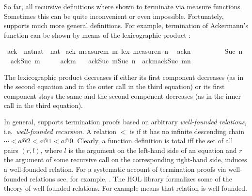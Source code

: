 %
\begin{isabellebody}%
\def\isabellecontext{WFrec}%
%
\begin{isamarkuptext}%
\noindent
So far, all recursive definitions where shown to terminate via measure
functions. Sometimes this can be quite inconvenient or even
impossible. Fortunately,  supports much more
general definitions. For example, termination of Ackermann's function
can be shown by means of the lexicographic product :%
\end{isamarkuptext}%
\ ack\ {\isacharcolon}{\isacharcolon}\ {\isachardoublequote}nat{\isasymtimes}nat\ {\isasymRightarrow}\ nat{\isachardoublequote}\isanewline
{}\ ack\ {\isachardoublequote}measure{\isacharparenleft}{\isasymlambda}m{\isachardot}\ m{\isacharparenright}\ {\isacharless}{\isacharasterisk}lex{\isacharasterisk}{\isachargreater}\ measure{\isacharparenleft}{\isasymlambda}n{\isachardot}\ n{\isacharparenright}{\isachardoublequote}\isanewline
\ \ {\isachardoublequote}ack{\isacharparenleft}{}{\isacharcomma}n{\isacharparenright}\ \ \ \ \ \ \ \ \ {\isacharequal}\ Suc\ n{\isachardoublequote}\isanewline
\ \ {\isachardoublequote}ack{\isacharparenleft}Suc\ m{\isacharcomma}{}{\isacharparenright}\ \ \ \ \ {\isacharequal}\ ack{\isacharparenleft}m{\isacharcomma}\ {}{\isacharparenright}{\isachardoublequote}\isanewline
\ \ {\isachardoublequote}ack{\isacharparenleft}Suc\ m{\isacharcomma}Suc\ n{\isacharparenright}\ {\isacharequal}\ ack{\isacharparenleft}m{\isacharcomma}ack{\isacharparenleft}Suc\ m{\isacharcomma}n{\isacharparenright}{\isacharparenright}{\isachardoublequote}%
\begin{isamarkuptext}%
\noindent
The lexicographic product decreases if either its first component
decreases (as in the second equation and in the outer call in the
third equation) or its first component stays the same and the second
component decreases (as in the inner call in the third equation).

In general,  supports termination proofs based on
arbitrary \emph{well-founded relations}, i.e.\ \emph{well-founded
recursion}.  A relation $<$ is
 if it has no infinite descending chain $\cdots <
a@2 < a@1 < a@0$. Clearly, a function definition is total iff the set
of all pairs $(r,l)$, where $l$ is the argument on the left-hand side
of an equation and $r$ the argument of some recursive call on the
corresponding right-hand side, induces a well-founded relation.  For a
systematic account of termination proofs via well-founded relations
see, for example, \cite{Baader-Nipkow}. The HOL library formalizes
some of the theory of well-founded relations. For example
 means that relation  is
well-founded.


\end{isamarkuptext}
\end{isabellebody}

